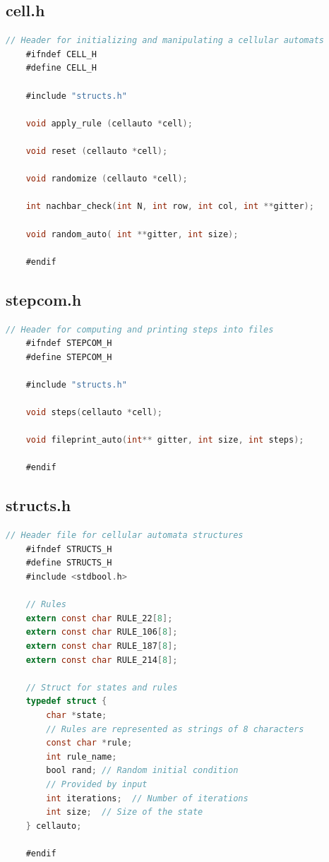 \documentclass[12pt,a4paper]{article}
\begin{document}
\subsection*{\small cell.h}
\begin{lstlisting}[caption={\small cell.h},label={lst:p7001},basicstyle=\ttfamily\tiny,language=C]
    // Header for initializing and manipulating a cellular automats
    #ifndef CELL_H
    #define CELL_H

    #include "structs.h"

    void apply_rule (cellauto *cell);

    void reset (cellauto *cell);

    void randomize (cellauto *cell);

    int nachbar_check(int N, int row, int col, int **gitter);

    void random_auto( int **gitter, int size);

    #endif
\end{lstlisting}


\vspace{1cm}

\subsection*{\small stepcom.h}
\begin{lstlisting}[caption={\small stepcom.h},label={lst:p7001},basicstyle=\ttfamily\tiny,language=C]
    // Header for computing and printing steps into files
    #ifndef STEPCOM_H
    #define STEPCOM_H

    #include "structs.h"

    void steps(cellauto *cell);

    void fileprint_auto(int** gitter, int size, int steps);

    #endif
\end{lstlisting}


\vspace{1cm}

\subsection*{\small structs.h}
\begin{lstlisting}[caption={\small structs.h},label={lst:p7001},basicstyle=\ttfamily\tiny,language=C]
    // Header file for cellular automata structures
    #ifndef STRUCTS_H
    #define STRUCTS_H
    #include <stdbool.h>

    // Rules
    extern const char RULE_22[8];
    extern const char RULE_106[8];
    extern const char RULE_187[8];
    extern const char RULE_214[8];

    // Struct for states and rules
    typedef struct {
        char *state;
        // Rules are represented as strings of 8 characters
        const char *rule;  
        int rule_name;
        bool rand; // Random initial condition
        // Provided by input
        int iterations;  // Number of iterations
        int size;  // Size of the state
    } cellauto;

    #endif
\end{lstlisting}
\end{document}
